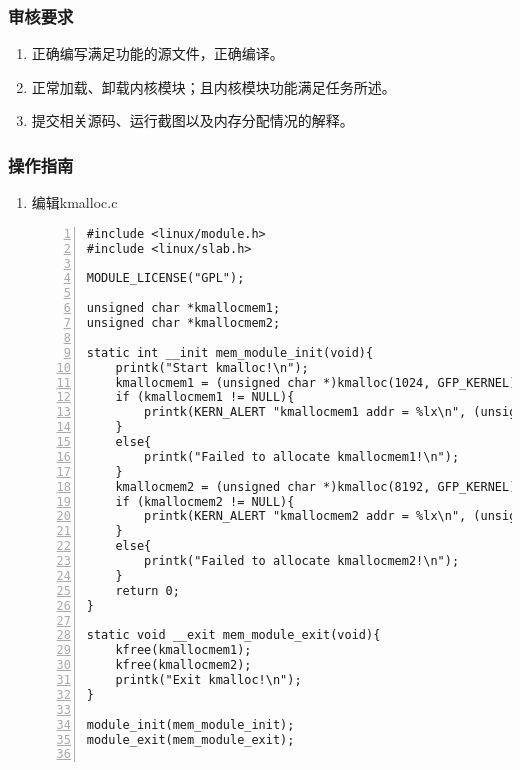 \documentclass{article}
\begin{document}
\subsubsection{审核要求}
\begin{enumerate}
    \item 正确编写满足功能的源文件，正确编译。
    \item 正常加载、卸载内核模块；且内核模块功能满足任务所述。
    \item 提交相关源码、运行截图以及内存分配情况的解释。
\end{enumerate}
\subsubsection{操作指南}
\begin{enumerate}
    \item 编辑kmalloc.c
    \begin{lstlisting}[numbers=left]
#include <linux/module.h>
#include <linux/slab.h>

MODULE_LICENSE("GPL");

unsigned char *kmallocmem1;
unsigned char *kmallocmem2;

static int __init mem_module_init(void){
	printk("Start kmalloc!\n");
	kmallocmem1 = (unsigned char *)kmalloc(1024, GFP_KERNEL);
	if (kmallocmem1 != NULL){
		printk(KERN_ALERT "kmallocmem1 addr = %lx\n", (unsigned long)kmallocmem1);
	}
	else{
		printk("Failed to allocate kmallocmem1!\n");
	}
	kmallocmem2 = (unsigned char *)kmalloc(8192, GFP_KERNEL);
	if (kmallocmem2 != NULL){
		printk(KERN_ALERT "kmallocmem2 addr = %lx\n", (unsigned long)kmallocmem2);
	}
	else{
		printk("Failed to allocate kmallocmem2!\n");
	}
	return 0;
}

static void __exit mem_module_exit(void){
	kfree(kmallocmem1);
	kfree(kmallocmem2);
	printk("Exit kmalloc!\n");
}

module_init(mem_module_init);
module_exit(mem_module_exit);


\end{lstlisting}
\end{enumerate}
\end{document}
